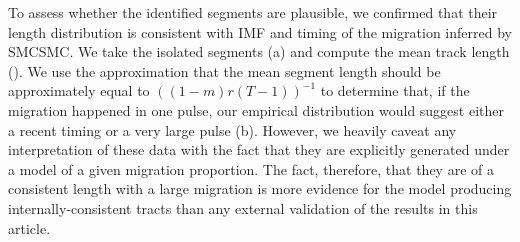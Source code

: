 To assess whether the identified segments are plausible, we confirmed that their length distribution is consistent with IMF and timing of the migration inferred by SMCSMC. We take the isolated segments (a) and compute the mean track length (). We use the approximation that the mean segment length should be approximately equal to $((1-m)r(T-1))^{-1}$ to determine that, if the migration happened in one pulse, our empirical distribution would suggest either a recent timing or a very large pulse (b). However, we heavily caveat any interpretation of these data with the fact that they are explicitly generated under a model of a given migration proportion. The fact, therefore, that they are of a consistent length with a large migration is more evidence for the model producing internally-consistent tracts than any external validation of the results in this article. 


